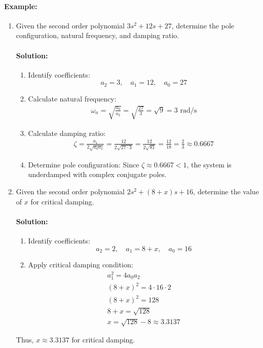 \paragraph{Example:}
\begin{enumerate}
  \item Given the second order polynomial \( 3s^2 + 12s + 27 \),
  determine the pole configuration, natural frequency, and
  damping ratio.
  \paragraph{Solution:}
  \begin{enumerate}
    \item Identify coefficients:
      \[ a_2 = 3, \quad a_1 = 12, \quad a_0 = 27 \]
    \item Calculate natural frequency:
      \begin{align*}
        \omega_n = \sqrt{\frac{a_0}{a_2}} = \sqrt{\frac{27}{3}} = \sqrt{9} = 3 \text{ rad/s}
      \end{align*}
    \item Calculate damping ratio:
      \begin{align*}
        \zeta = \frac{a_1}{2\sqrt{a_0 a_2}} = \frac{12}{2\sqrt{27 \cdot 3}} = \frac{12}{2\sqrt{81}} = \frac{12}{18} = \frac{2}{3} \approx 0.6667
      \end{align*}
    \item Determine pole configuration:
      Since \( \zeta \approx 0.6667 < 1 \), the system is underdamped with
      complex conjugate poles.
  \end{enumerate}
  \item Given the second order polynomial \( 2s^2 + (8 + x)s + 16 \),
  determine the value of \( x \) for critical damping.
  \paragraph{Solution:}
  \begin{enumerate}
    \item Identify coefficients:
      \[ a_2 = 2, \quad a_1 = 8 + x, \quad a_0 = 16 \]
    \item Apply critical damping condition:
      \begin{align*}
        a_1^2 = 4 a_0 a_2 \\
        (8 + x)^2 = 4 \cdot 16 \cdot 2 \\
        (8 + x)^2 = 128 \\
        8 + x = \sqrt{128} \\
        x = \sqrt{128} - 8 \approx 3.3137
      \end{align*}
  \end{enumerate}
  Thus, \( x \approx 3.3137 \) for critical damping.
\end{enumerate}

